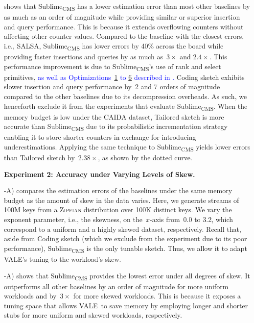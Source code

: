 \documentclass[sigconf]{acmart}
\newcommand{\sketch}{Sublime}
\newcommand{\sketchcms}{\sketch\textsubscript{CMS}\xspace}
\newcommand{\counterencodingabbrv}{VALE}
\begin{document}
shows that \sketchcms has a lower estimation error than most other baselines by
as much as an order of magnitude while providing similar or superior insertion
and query performance. This is because it extends overflowing counters without
affecting other counter values. Compared to the baseline with the closest
errors, i.e., SALSA, \sketchcms has lower errors by 40\% across the board while
providing faster insertions and queries by as much as~$3\times$ and
$2.4\times$. This performance improvement is due to \sketchcms's use of rank
and select primitives, \textcolor{blue}{as well as
Optimizations~\hyperlink{optimization:fast_division}{1} to
\hyperlink{optimization:horner_hack}{6} described in
.} Coding
sketch exhibits slower insertion and query performance by~2 and 7 orders of
magnitude compared to the other baselines due to its decompression overheads.
As such, we henceforth exclude it from the experiments that evaluate
\sketchcms. When the memory budget is low under the \textsc{CAIDA} dataset,
Tailored sketch is more accurate than \sketchcms due to its probabilistic
incrementation strategy enabling it to store shorter counters in exchange for
introducing underestimations. Applying the same technique to \sketchcms yields
lower errors than Tailored sketch by~$2.38\times$, as shown by the dotted
curve.

\hypertarget{experiment:skew}{\textbf{Experiment 2: Accuracy under Varying Levels of Skew.}}
-A) compares the estimation errors of the
baselines under the same memory budget as the amount of skew in the data
varies. Here, we generate streams of 100M keys from a \textsc{Zipfian}
distribution over 100K distinct keys. We vary the exponent parameter, i.e., the
skewness, on the~$x${\nobreakdash-}axis from~0.0 to 3.2, which correspond to a
uniform and a highly skewed dataset, respectively. Recall that, aside from
Coding sketch (which we exclude from the experiment due to its poor
performance), \sketchcms is the only tunable sketch. Thus, we allow it to adapt
\counterencodingabbrv's tuning to the workload's skew.

-A) shows that \sketchcms provides the lowest
error under all degrees of skew. It outperforms all other baselines by an order
of magnitude for more uniform workloads and by~$3\times$ for more skewed
workloads. This is because it exposes a tuning space that allows
\counterencodingabbrv\ to save memory by employing longer and shorter stubs for
more uniform and skewed workloads, respectively. 
\end{document}
